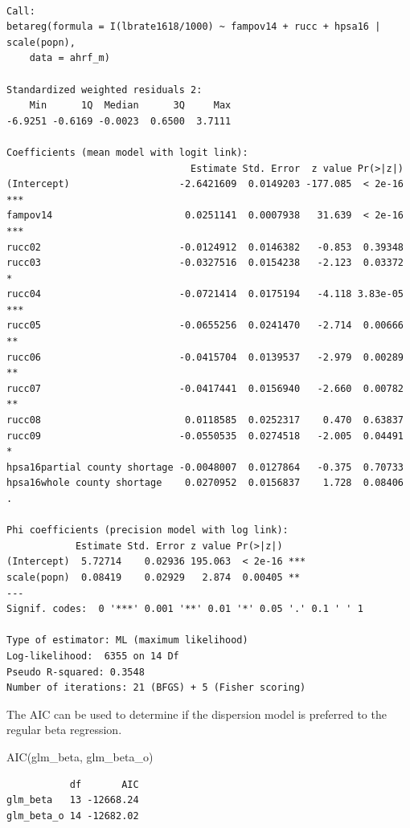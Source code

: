 \documentclass[
  letterpaper,
  DIV=11,
  numbers=noendperiod]{scrreprt}
\newenvironment{Shaded}{\begin{snugshade}}{\end{snugshade}}
\newcommand{\FunctionTok}[1]{\textcolor[rgb]{0.28,0.35,0.67}{#1}}
\newcommand{\NormalTok}[1]{\textcolor[rgb]{0.00,0.23,0.31}{#1}}
\begin{document}
\begin{verbatim}

Call:
betareg(formula = I(lbrate1618/1000) ~ fampov14 + rucc + hpsa16 | scale(popn), 
    data = ahrf_m)

Standardized weighted residuals 2:
    Min      1Q  Median      3Q     Max 
-6.9251 -0.6169 -0.0023  0.6500  3.7111 

Coefficients (mean model with logit link):
                                Estimate Std. Error  z value Pr(>|z|)    
(Intercept)                   -2.6421609  0.0149203 -177.085  < 2e-16 ***
fampov14                       0.0251141  0.0007938   31.639  < 2e-16 ***
rucc02                        -0.0124912  0.0146382   -0.853  0.39348    
rucc03                        -0.0327516  0.0154238   -2.123  0.03372 *  
rucc04                        -0.0721414  0.0175194   -4.118 3.83e-05 ***
rucc05                        -0.0655256  0.0241470   -2.714  0.00666 ** 
rucc06                        -0.0415704  0.0139537   -2.979  0.00289 ** 
rucc07                        -0.0417441  0.0156940   -2.660  0.00782 ** 
rucc08                         0.0118585  0.0252317    0.470  0.63837    
rucc09                        -0.0550535  0.0274518   -2.005  0.04491 *  
hpsa16partial county shortage -0.0048007  0.0127864   -0.375  0.70733    
hpsa16whole county shortage    0.0270952  0.0156837    1.728  0.08406 .  

Phi coefficients (precision model with log link):
            Estimate Std. Error z value Pr(>|z|)    
(Intercept)  5.72714    0.02936 195.063  < 2e-16 ***
scale(popn)  0.08419    0.02929   2.874  0.00405 ** 
---
Signif. codes:  0 '***' 0.001 '**' 0.01 '*' 0.05 '.' 0.1 ' ' 1 

Type of estimator: ML (maximum likelihood)
Log-likelihood:  6355 on 14 Df
Pseudo R-squared: 0.3548
Number of iterations: 21 (BFGS) + 5 (Fisher scoring) 
\end{verbatim}

The AIC can be used to determine if the dispersion model is preferred to
the regular beta regression.

\begin{Shaded}
\begin{Highlighting}[]
\FunctionTok{AIC}\NormalTok{(glm\_beta, glm\_beta\_o)}
\end{Highlighting}
\end{Shaded}

\begin{verbatim}
           df       AIC
glm_beta   13 -12668.24
glm_beta_o 14 -12682.02
\end{verbatim}
\end{document}
